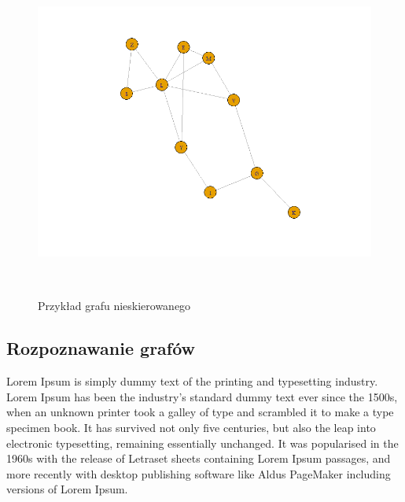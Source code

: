 \begin{figure}[ht]
	\centering
	\includegraphics[height=11cm]{partials/images/graph_undirected.png}
	\caption{Przykład grafu nieskierowanego}
    \label{Fig:GraphDirected}
\end{figure}
\FloatBarrier

\subsection{Rozpoznawanie grafów}
Lorem Ipsum is simply dummy text of the printing and typesetting industry. Lorem Ipsum has been the industry's standard dummy text ever since the 1500s, when an unknown printer took a galley of type and scrambled it to make a type specimen book. It has survived not only five centuries, but also the leap into electronic typesetting, remaining essentially unchanged. It was popularised in the 1960s with the release of Letraset sheets containing Lorem Ipsum passages, and more recently with desktop publishing software like Aldus PageMaker including versions of Lorem Ipsum.
